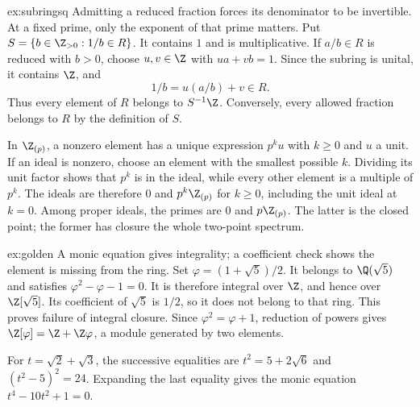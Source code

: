 \begin{solution}{ex:subringsq}
\idea Admitting a reduced fraction forces its denominator to be invertible. At a fixed prime, only the exponent of that prime matters.
\writeup Put $S=\{b\in\Z_{>0}:1/b\in R\}$. It contains $1$ and is multiplicative. If $a/b\in R$ is reduced with $b>0$, choose $u,v\in\Z$ with $ua+vb=1$. Since the subring is unital, it contains $\Z$, and
\[
 1/b=u(a/b)+v\in R.
\]
Thus every element of $R$ belongs to $S^{-1}\Z$. Conversely, every allowed fraction belongs to $R$ by the definition of $S$.

In $\Z_{(p)}$, a nonzero element has a unique expression $p^ku$ with $k\ge0$ and $u$ a unit. If an ideal is nonzero, choose an element with the smallest possible $k$. Dividing its unit factor shows that $p^k$ is in the ideal, while every other element is a multiple of $p^k$. The ideals are therefore $0$ and $p^k\Z_{(p)}$ for $k\ge0$, including the unit ideal at $k=0$. Among proper ideals, the primes are $0$ and $p\Z_{(p)}$. The latter is the closed point; the former has closure the whole two-point spectrum.
\end{solution}

\begin{solution}{ex:golden}
\idea A monic equation gives integrality; a coefficient check shows the element is missing from the ring.
\writeup Set $\varphi=(1+\sqrt5)/2$. It belongs to $\Q(\sqrt5)$ and satisfies $\varphi^2-\varphi-1=0$. It is therefore integral over $\Z$, and hence over $\Z[\sqrt5]$. Its coefficient of $\sqrt5$ is $1/2$, so it does not belong to that ring. This proves failure of integral closure. Since $\varphi^2=\varphi+1$, reduction of powers gives
$\Z[\varphi]=\Z+\Z\varphi$, a module generated by two elements.

For $t=\sqrt2+\sqrt3$, the successive equalities are $t^2=5+2\sqrt6$ and $(t^2-5)^2=24$. Expanding the last equality gives the monic equation $t^4-10t^2+1=0$.
\end{solution}

